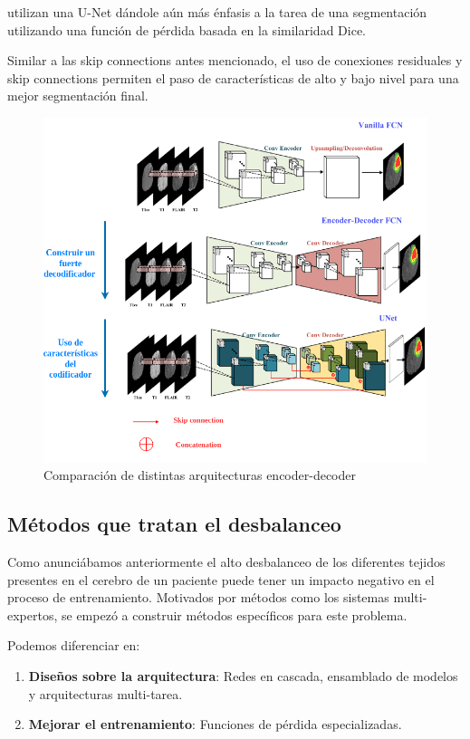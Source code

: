 \begin{enumerate}
				\cite{isensee2018brain} utilizan una U-Net dándole aún más énfasis a la tarea de una segmentación utilizando una función de pérdida basada en la similaridad Dice.
				
				Similar a las skip connections antes mencionado, el uso de conexiones residuales  y skip connections permiten el paso de características de alto y bajo nivel para una mejor segmentación final.
				
				\begin{figure}[H]
					\centering
					\includegraphics[width=0.85\linewidth]{imagenes/encoder-decoderIMG.drawio.png}
					\caption{Comparación de distintas arquitecturas encoder-decoder}
				\end{figure}
				
			\end{enumerate}
			
			
		\subsection{Métodos que tratan el desbalanceo}
		
		Como anunciábamos anteriormente el alto desbalanceo de los diferentes tejidos presentes en el cerebro de un paciente puede tener un impacto negativo en el proceso de entrenamiento. Motivados por métodos como los sistemas multi-expertos, se empezó a construir métodos específicos para este problema.
		
		Podemos diferenciar en:
		\begin{enumerate}
			\item \textbf{Diseños sobre la arquitectura}: Redes en cascada, ensamblado de modelos y arquitecturas multi-tarea.
			\item \textbf{Mejorar el entrenamiento}: Funciones de pérdida especializadas.
		\end{enumerate}
		
